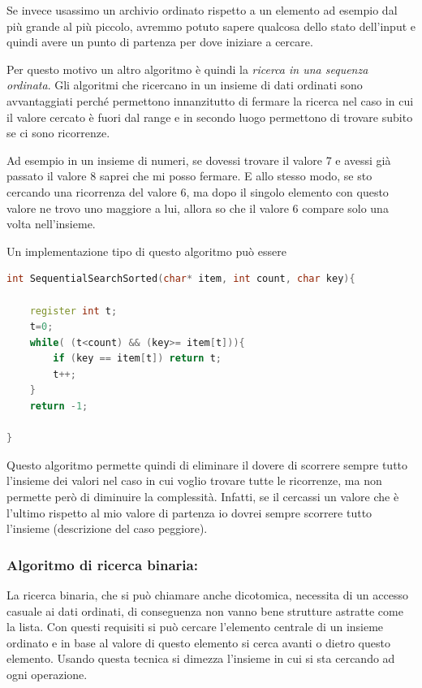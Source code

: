 \documentclass[
  paper=a4,
  oneside  ,captions=tableheading
]{scrbook}
\begin{document}
Se invece usassimo un archivio ordinato rispetto a un elemento ad
esempio dal più grande al più piccolo, avremmo potuto sapere qualcosa
dello stato dell'input e quindi avere un punto di partenza per dove
iniziare a cercare.

Per questo motivo un altro algoritmo è quindi la \emph{ricerca in una
sequenza ordinata}. Gli algoritmi che ricercano in un insieme di dati
ordinati sono avvantaggiati perché permettono innanzitutto di fermare la
ricerca nel caso in cui il valore cercato è fuori dal range e in secondo
luogo permettono di trovare subito se ci sono ricorrenze.

Ad esempio in un insieme di numeri, se dovessi trovare il valore 7 e
avessi già passato il valore 8 saprei che mi posso fermare. E allo
stesso modo, se sto cercando una ricorrenza del valore 6, ma dopo il
singolo elemento con questo valore ne trovo uno maggiore a lui, allora
so che il valore 6 compare solo una volta nell'insieme.

Un implementazione tipo di questo algoritmo può essere

\begin{lstlisting}[language={C++}]
int SequentialSearchSorted(char* item, int count, char key){
    
    register int t;
    t=0;
    while( (t<count) && (key>= item[t])){
        if (key == item[t]) return t;
        t++;
    }
    return -1;
    
}
\end{lstlisting}

Questo algoritmo permette quindi di eliminare il dovere di scorrere
sempre tutto l'insieme dei valori nel caso in cui voglio trovare tutte
le ricorrenze, ma non permette però di diminuire la complessità.
Infatti, se il cercassi un valore che è l'ultimo rispetto al mio valore
di partenza io dovrei sempre scorrere tutto l'insieme (descrizione del
caso peggiore).

\hypertarget{algoritmo-di-ricerca-binaria}{%
\subsubsection{Algoritmo di ricerca
binaria:}\label{algoritmo-di-ricerca-binaria}}

La ricerca binaria, che si può chiamare anche dicotomica, necessita di
un accesso casuale ai dati ordinati, di conseguenza non vanno bene
strutture astratte come la lista. Con questi requisiti si può cercare
l'elemento centrale di un insieme ordinato e in base al valore di questo
elemento si cerca avanti o dietro questo elemento. Usando questa tecnica
si dimezza l'insieme in cui si sta cercando ad ogni operazione.
\end{document}
